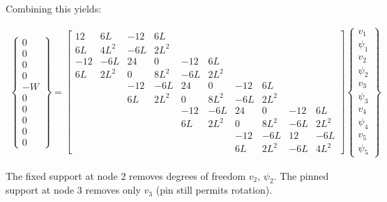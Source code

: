 \documentclass[10pt,letterpaper]{article}
\begin{document}
	Combining this yields:

	\begin{align} 
		\begin{Bmatrix}
			0 \\
			0 \\
			0 \\
			0 \\
			-W \\
			0 \\
			0 \\
			0 \\
			0 \\
			0
		\end{Bmatrix} = \begin{bmatrix}
12 & 6L & -12 & 6L & & & & & & \\
6L & 4L^2 & -6L & 2L^2 & & & & & & \\
-12 & -6L & 24 & 0 & -12 & 6L & & & & \\
6L & 2L^2 & 0 & 8L^2 & -6L & 2L^2 & & & & \\
 & & -12 & -6L & 24 & 0 & -12 & 6L & & \\
 & & 6L & 2L^2 & 0 & 8L^2 & -6L & 2L^2 & & \\
 & & & & -12 & -6L & 24 & 0 & -12 & 6L \\
 & & & & 6L & 2L^2 & 0 & 8L^2 & -6L & 2L^2 \\
 & & & & & & -12 & -6L & 12 & -6L \\
 & & & & & & 6L & 2L^2 & -6L & 4L^2
		\end{bmatrix} \begin{Bmatrix}
			v_1 \\
			\psi_1 \\
			v_2 \\
			\psi_2 \\
			v_3 \\
			\psi_3 \\
			v_4 \\
			\psi_4 \\
			v_5 \\
			\psi_5
		\end{Bmatrix}
	\end{align}

	The fixed support at node 2 removes degrees of freedom $v_2$, $\psi_2$. The pinned support at node 3 removes only $v_3$ (pin still permits rotation).
\end{document}
